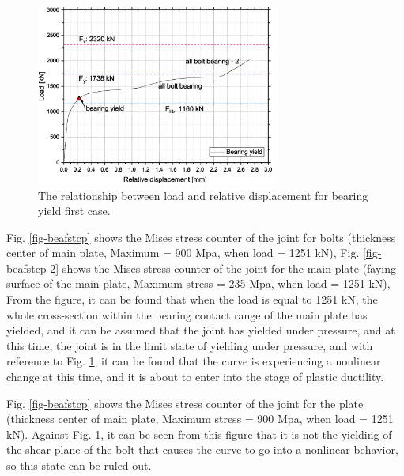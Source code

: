 \begin{figure}[htbp]
    \centering
    \includegraphics[width=0.7\textwidth]{imgs/ch7/b4s40t30.eps}
    \caption{The relationship between load and relative displacement for bearing yield first case.}
    \label{fig-beafst}
\end{figure}

Fig. \ref{fig-beafstcp} shows the Mises stress counter of the joint for bolts (thickness center of main plate, Maximum = 900 Mpa, when load = 1251 kN), Fig. \ref{fig-beafstcp-2} shows the Mises stress counter of the joint for the main plate (faying surface of the main plate, Maximum stress = 235 Mpa, when load = 1251 kN), From the figure, it can be found that when the load is equal to 1251 kN, the whole cross-section within the bearing contact range of the main plate has yielded, and it can be assumed that the joint has yielded under pressure, and at this time, the joint is in the limit state of yielding under pressure, and with reference to Fig. \ref{fig-beafst}, it can be found that the curve is experiencing a nonlinear change at this time, and it is about to enter into the stage of plastic ductility.

Fig. \ref{fig-beafstcp} shows the Mises stress counter of the joint for the plate (thickness center of main plate, Maximum stress = 900 Mpa, when load = 1251 kN). Against Fig. \ref{fig-beafst}, it can be seen from this figure that it is not the yielding of the shear plane of the bolt that causes the curve to go into a nonlinear behavior, so this state can be ruled out.

